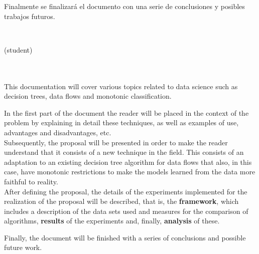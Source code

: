 Finalmente se finalizará el documento con una serie de conclusiones y posibles trabajos futuros.

\cleardoublepage


\thispagestyle{empty}


\begin{center}
{\large\bfseries \myTitleEng}\\
\end{center}
\begin{center}
\myName (student)\\
\end{center}

\\

\vspace{0.7cm}
\\

This documentation will cover various topics related to data science such as decision trees, data flows and monotonic classification.

In the first part of the document the reader will be placed in the context of the problem by explaining in detail these techniques, as well as examples of use, advantages and disadvantages, etc. \\

Subsequently, the proposal will be presented in order to make the reader understand that it consists of a new technique in the field. This consists of an adaptation to an existing decision tree algorithm for data flows that also, in this case, have monotonic restrictions to make the models learned from the data more faithful to reality. \\

After defining the proposal, the details of the experiments implemented for the realization of the proposal will be described, that is, the \textbf{framework}, which includes a description of the data sets used and measures for the comparison of algorithms, \textbf{results} of the experiments and, finally, \textbf{analysis} of these.

Finally, the document will be finished with a series of conclusions and possible future work.

\chapter*{}
\thispagestyle{empty}

